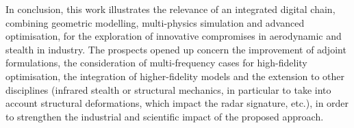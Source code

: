 In conclusion, this work illustrates the relevance of an integrated digital chain, combining geometric modelling, multi-physics simulation and advanced optimisation, for the exploration of innovative compromises in aerodynamic and stealth in industry. The prospects opened up concern the improvement of adjoint formulations, the consideration of multi-frequency cases for high-fidelity optimisation, the integration of higher-fidelity models and the extension to other disciplines (infrared stealth or structural mechanics, in particular to take into account structural deformations, which impact the radar signature, etc.), in order to strengthen the industrial and scientific impact of the proposed approach.

